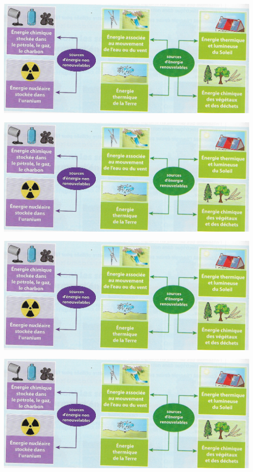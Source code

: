 \documentclass[12pt,a4paper]{article}
\begin{document}
	
\graphicspath{{./img/}}	

\begin{center}
	\includegraphics[scale=0.8]{types_energie}
\end{center}

\begin{center}
	\includegraphics[scale=0.8]{types_energie}
\end{center}

\begin{center}
	\includegraphics[scale=0.8]{types_energie}
\end{center}

\begin{center}
	\includegraphics[scale=0.8]{types_energie}
\end{center}
\end{document}
